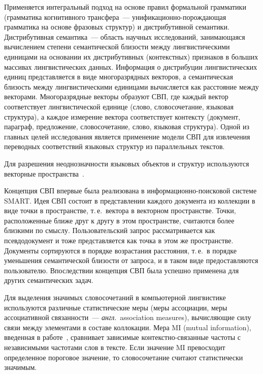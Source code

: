 \begin{multicols}{2}
  Применяется интегральный подход на основе правил формальной 
грамматики (грамматика когнитив\-ного трансфера~--- 
  уни\-фи\-ка\-ци\-он\-но-по\-рож\-да\-ющая грамматика на основе фразовых 
структур) и дистрибутивной семантики. Дистрибутивная семантика~--- 
  об\-ласть научных исследований, занимающаяся вычислением степени 
семантической близости между лингвистическими единицами на основании 
их дистрибутивных (контекстных) признаков в больших массивах 
лингвистических данных. Информация о дистрибуции лингвистических 
единиц представляется в виде многоразрядных векторов, а семантическая 
близость между лингвистическими единицами вычисляется как расстояние 
между векторами. Многоразрядные векторы образуют
СВП, где каждый вектор соответствует лингвистической 
единице (слово, словосочетание, языковая структура), а каждое измерение 
вектора соответствует контексту (документ, параграф, предложение, 
словосочетание, слово, языковая структура). Одной из главных целей 
исследования является применение модели СВП
для извлечения переводных соответствий языковых структур из 
параллельных текстов.
  
  Для разрешения неоднозначности языковых объектов и структур 
используются векторные пространства~\cite{18-koz, 19-koz}.
  
  Концепция СВП впервые была 
реализована в ин\-фор\-ма\-ци\-он\-но-по\-иско\-вой сис\-те\-ме SMART. Идея СВП 
состоит в представлении каждого документа из коллекции в виде точки в 
пространстве, т.\,е.\ вектора в векторном пространстве. Точки, 
расположенные ближе друг к другу в этом пространстве, считаются более 
близкими по смыслу. Пользовательский запрос рассматривается как 
псевдодокумент и тоже представляется как точка в этом же пространстве. 
Документы сортируются в порядке возрастания расстояния, т.\,е.\ в порядке 
уменьшения семантической близости от запроса, и в таком виде 
предоставляются пользователю. Впоследствии концепция СВП была 
успешно применена для других семантических задач. 
  
  Для выделения значимых словосочетаний в компьютерной лингвистике 
используются различные статистические меры (меры ассоциации, меры 
ассоциативной связанности~--- \textit{англ}.\ association measures), вычисляющие силу 
связи между элементами в составе коллокации. Мера MI (mutual information), 
введенная в работе~\cite{31-koz}, сравнивает зависимые 
  кон\-текст\-но-свя\-зан\-ные частоты с независимыми частотами слов в 
тексте. Если значение MI превосходит определенное пороговое значение, то 
словосочетание считают статистически значимым.


\end{multicols}
